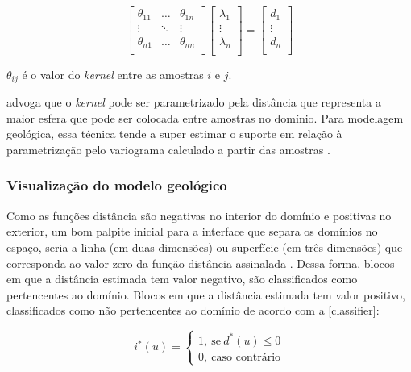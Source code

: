 \begin{equation}
    \label{rbf_sist}
    \begin{bmatrix} 
    \theta_{11}&\dots&\theta_{1n}\\
    \vdots&\ddots&\vdots\\
    \theta_{n1}&\dots&\theta_{nn}\\ 
    \end{bmatrix}
    \begin{bmatrix} 
    \lambda_{1}\\
    \vdots\\
    \lambda_{n}\\ 
    \end{bmatrix}
    =
    \begin{bmatrix} 
    d_{1}\\
    \vdots\\
    d_{n}\\ 
    \end{bmatrix}
\end{equation}

$\theta_{ij}$ é o valor do \textit{kernel} entre as amostras $i$ e $j$.

 advoga que o \textit{kernel} pode ser parametrizado pela distância que representa a maior esfera que pode ser colocada entre amostras no domínio. Para modelagem geológica, essa técnica tende a super estimar o suporte em relação à parametrização pelo variograma calculado a partir das amostras \cite{martin2017implicitmodeling}.

\subsubsection{Visualização do modelo geológico}

Como as funções distância são negativas no interior do domínio e positivas no exterior, um bom palpite inicial para a interface que separa os domínios no espaço, seria a linha (em duas dimensões) ou superfície (em três dimensões) que corresponda ao valor zero da função distância assinalada \cite{wildedeutschcalibrate}. Dessa forma, blocos em que a distância estimada tem valor negativo, são classificados como pertencentes ao domínio. Blocos em que a distância estimada tem valor positivo, classificados como não pertencentes ao domínio de acordo com a \autoref{classifier}:

\begin{equation}
	i^*(u)=\begin{cases}
	1,\:\textrm{se}\:d^*(u)\leq0\\
	0,\:\textrm{caso contrário}\end{cases}
    \label{classifier}
\end{equation}

